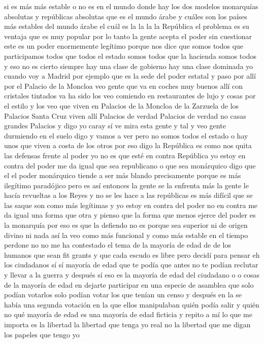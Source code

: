 si es más más estable o no es en el mundo donde hay los dos modelos monarquías absolutas y repúblicas absolutas
que es el mundo árabe y cuáles son los países más estables del mundo árabe
el cuál es la la la la República el problema es su ventaja
que es muy popular por lo tanto la gente acepta el poder sin cuestionar
este es un poder enormemente legítimo porque nos dice que somos todos que participamos todos que todos el estado somos todos
que la hacienda somos todos y eso no es cierto siempre hay una clase de gobierno hay una clase dominada
yo cuando voy a Madrid por ejemplo que es la sede del poder estatal y paso por allí por el Palacio de la Moncloa
veo gente que va en coches muy buenos allí con cristales tintados va ha sido
los veo comiendo en restaurantes de lujo y cosas por el estilo y los veo que viven en Palacios de la Moncloa de la Zarzuela
de los Palacios Santa Cruz viven allí Palacios de verdad Palacios de verdad no casas grandes Palacios
y digo yo caray sí ve mira esta gente y tal y veo gente durmiendo en el suelo digo y vamos a ver pero no somos todos el estado
o hay unos que viven a costa de los otros
por eso digo la República es como nos quita las defensas frente al poder
yo no es que esté en contra República yo estoy en contra del poder me da igual que sea republicano o que sea monárquico digo que el el poder monárquico
tiende a ser más blando precisamente porque es más ilegítimo paradójico pero es así entonces
la gente se la enfrenta más la gente le hacía revueltas a los Reyes y no se les hace a las repúblicas es más difícil que se las saque
son como más legítimas y yo estoy en contra del poder no en contra me da igual una forma que otra y pienso que la forma
que menos ejerce del poder es la monarquía por eso es que la defiendo no es porque sea superior ni de origen divino ni nada así
la veo como más funcional y como más estable en el tiempo
perdone no no me ha contestado el tema de la mayoría de edad de de los humanos que sean fit grants y que cada escudo es libre
pero decidí para pensar eh los ciudadanos sí sí mayoría de edad que te podía
que antes no te podían reclutar y llevar a la guerra y después sí eso es la mayoría de edad del ciudadano o o cosas de la mayoría de edad
en dejarte participar en una especie de asamblea que solo podían votarlos solo podían votar los que tenían un censo
y después en la se había una segunda votación en la que ellos manipulaban quién podía salir y quién no qué mayoría de edad
es una mayoría de edad ficticia y repito a mí lo que me importa es la libertad la libertad que tenga yo real no la libertad que me digan los papeles que tengo yo
